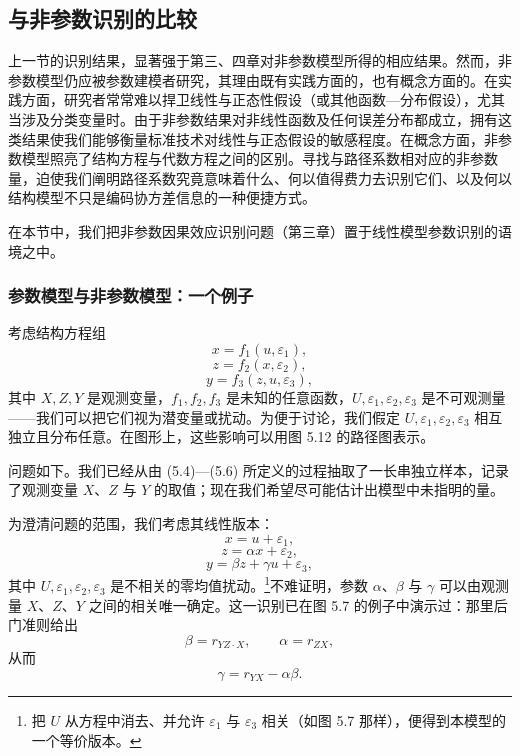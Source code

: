 \subsection{与非参数识别的比较}

上一节的识别结果，显著强于第三、四章对非参数模型所得的相应结果。然而，非参数模型仍应被参数建模者研究，其理由既有实践方面的，也有概念方面的。在实践方面，研究者常常难以捍卫线性与正态性假设（或其他函数—分布假设），尤其当涉及分类变量时。由于非参数结果对非线性函数及任何误差分布都成立，拥有这类结果使我们能够衡量标准技术对线性与正态假设的敏感程度。在概念方面，非参数模型照亮了结构方程与代数方程之间的区别。寻找与路径系数相对应的非参数量，迫使我们阐明路径系数究竟意味着什么、何以值得费力去识别它们、以及何以结构模型不只是编码协方差信息的一种便捷方式。

在本节中，我们把非参数因果效应识别问题（第三章）置于线性模型参数识别的语境之中。

\subsubsection*{参数模型与非参数模型：一个例子}

考虑结构方程组
\begin{equation}
x=f_1(u,\varepsilon_1), \tag{5.4}
\end{equation}
\begin{equation}
z=f_2(x,\varepsilon_2), \tag{5.5}
\end{equation}
\begin{equation}
y=f_3(z,u,\varepsilon_3), \tag{5.6}
\end{equation}
其中 $X,Z,Y$ 是观测变量，$f_1,f_2,f_3$ 是未知的任意函数，$U,\varepsilon_1,\varepsilon_2,\varepsilon_3$ 是不可观测量——我们可以把它们视为潜变量或扰动。为便于讨论，我们假定 $U,\varepsilon_1,\varepsilon_2,\varepsilon_3$ 相互独立且分布任意。在图形上，这些影响可以用图 5.12 的路径图表示。

问题如下。我们已经从由 \textup{(5.4)}—\textup{(5.6)} 所定义的过程抽取了一长串独立样本，记录了观测变量 $X$、$Z$ 与 $Y$ 的取值；现在我们希望尽可能估计出模型中未指明的量。

为澄清问题的范围，我们考虑其线性版本：
\begin{equation}
x=u+\varepsilon_1, \tag{5.7}
\end{equation}
\begin{equation}
z=\alpha x+\varepsilon_2, \tag{5.8}
\end{equation}
\begin{equation}
y=\beta z+\gamma u+\varepsilon_3, \tag{5.9}
\end{equation}
其中 $U,\varepsilon_1,\varepsilon_2,\varepsilon_3$ 是不相关的零均值扰动。\footnote{把 $U$ 从方程中消去、并允许 $\varepsilon_1$ 与 $\varepsilon_3$ 相关（如图 5.7 那样），便得到本模型的一个等价版本。}不难证明，参数 $\alpha$、$\beta$ 与 $\gamma$ 可以由观测量 $X$、$Z$、$Y$ 之间的相关唯一确定。这一识别已在图 5.7 的例子中演示过：那里后门准则给出
\begin{equation}
\beta=r_{YZ\cdot X},\qquad \alpha=r_{ZX}, \tag{5.10}
\end{equation}
从而
\begin{equation}
\gamma=r_{YX}-\alpha\beta. \tag{5.11}
\end{equation}

